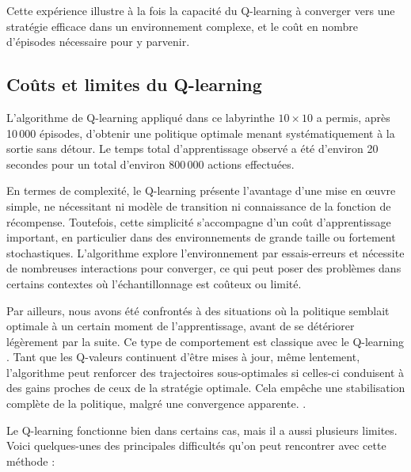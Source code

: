 \documentclass[12pt]{article}
\begin{document}
Cette expérience illustre à la fois la capacité du Q-learning à converger vers une stratégie efficace dans un environnement complexe, et le coût en nombre d’épisodes nécessaire pour y parvenir.


\subsection{Coûts et limites du Q-learning}

L’algorithme de Q-learning appliqué dans ce labyrinthe \(10 \times 10\) a permis, après 10\,000 épisodes, d’obtenir une politique optimale menant systématiquement à la sortie sans détour. Le temps total d’apprentissage observé a été d’environ 20 secondes pour un total d’environ 800\,000 actions effectuées.

En termes de complexité, le Q-learning présente l’avantage d’une mise en œuvre simple, ne nécessitant ni modèle de transition ni connaissance de la fonction de récompense. Toutefois, cette simplicité s’accompagne d’un coût d’apprentissage important, en particulier dans des environnements de grande taille ou fortement stochastiques. L’algorithme explore l’environnement par essais-erreurs et nécessite de nombreuses interactions pour converger, ce qui peut poser des problèmes dans certains contextes où l’échantillonnage est coûteux ou limité.

Par ailleurs, nous avons été confrontés à des situations où la politique semblait optimale à un certain moment de l’apprentissage, avant de se détériorer légèrement par la suite. Ce type de comportement est classique avec le Q-learning . Tant que les Q-valeurs continuent d’être mises à jour, même lentement, l’algorithme peut renforcer des trajectoires sous-optimales si celles-ci conduisent à des gains proches de ceux de la stratégie optimale. Cela empêche une stabilisation complète de la politique, malgré une convergence apparente.
.


Le Q-learning fonctionne bien dans certains cas, mais il a aussi plusieurs limites. Voici quelques-unes des principales difficultés qu’on peut rencontrer avec cette méthode :
\end{document}
